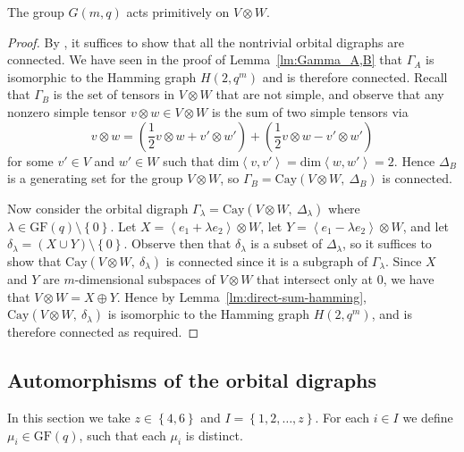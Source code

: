 \documentclass[ALCO, Unicode]{cedram}
\newcommand{\Cay}{\mathrm{Cay}}
\newcommand{\GF}{\mathrm{GF}}
\begin{document}
\begin{prop} \label{prop:primitive}
The group $G{\left(m, q \right)}$ acts primitively on $V \otimes W$.
\end{prop}
\begin{proof}
By \cite[1.12]{ref:higman-intersection}, it suffices to show that all the nontrivial orbital digraphs are connected. We have seen in the proof of Lemma~\ref{lm:Gamma_A,B} that $\Gamma_A$ is isomorphic to the Hamming graph $H{\left(2, q^m \right)}$ and is therefore connected. Recall that $\Gamma_B$ is the set of tensors in $V \otimes W$ that are not simple, and observe that any nonzero simple tensor $v \otimes w \in V \otimes W$ is the sum of two simple tensors via
\begin{displaymath}
v \otimes w = \left(\frac{1}{2} v \otimes w + v' \otimes w' \right) + \left(\frac{1}{2} v \otimes w - v' \otimes w' \right)
\end{displaymath}
for some $v' \in V$ and $w' \in W$ such that $\mathrm{dim} \left<v, v' \right> = \mathrm{dim} \left<w, w' \right> = 2$. Hence $\Delta_B$ is a generating set for the group $V \otimes W$, so $\Gamma_B = \Cay{\left(V \otimes W,\ \Delta_B \right)}$ is connected.

Now consider the orbital digraph $\Gamma_\lambda = \Cay{\left(V \otimes W,\ \Delta_\lambda \right)}$ where $\lambda \in \GF{\left(q \right)} \setminus \left\{0 \right\}$. Let $X = \left<e_1 + \lambda e_2 \right> \otimes W$, let $Y = \left<e_1 - \lambda e_2 \right> \otimes W$, and let $\delta_\lambda = \left(X \cup Y \right) \setminus \left\{0 \right\}$. Observe then that $\delta_\lambda$ is a subset of $\Delta_\lambda$, so it suffices to show that $\Cay{\left(V \otimes W,\ \delta_\lambda \right)}$ is connected since it is a subgraph of $\Gamma_\lambda$. Since $X$ and $Y$ are $m$-dimensional subspaces of $V \otimes W$ that intersect only at $0$, we have that $V \otimes W = X \oplus Y$. Hence by Lemma~\ref{lm:direct-sum-hamming}, $\Cay{\left(V \otimes W,\ \delta_\lambda \right)}$ is isomorphic to the Hamming graph $H{\left(2, q^m \right)}$, and is therefore connected as required.
\end{proof}

\subsection{Automorphisms of the orbital digraphs}
In this section we take $z \in \left\{4, 6 \right\}$ and $I = \left\{1, 2, \ldots, z \right\}$. For each $i \in I$ we define $\mu_i \in \GF{\left(q \right)}$, such that each $\mu_i$ is distinct.
\end{document}
